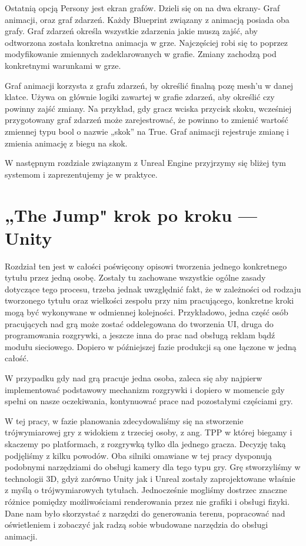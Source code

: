 \documentclass[openright]{xmgr}
\begin{document}
Ostatnią opcją Persony jest ekran grafów. Dzieli się on na dwa ekrany- Graf animacji, oraz graf zdarzeń. Każdy Blueprint związany z animacją posiada oba grafy.
Graf zdarzeń określa wszystkie zdarzenia jakie muszą zajść, aby odtworzona została konkretna animacja w grze. Najczęściej robi się to poprzez modyfikowanie zmiennych zadeklarowanych w grafie. Zmiany zachodzą pod konkretnymi warunkami w grze.

Graf animacji korzysta z grafu zdarzeń, by określić finalną pozę mesh’u w danej klatce. Używa on głównie logiki zawartej w grafie zdarzeń, aby określić czy powinny zajść zmiany. Na przykład, gdy gracz wciska przycisk skoku, wcześniej przygotowany graf zdarzeń może zarejestrować, że powinno to zmienić wartość zmiennej typu bool o nazwie „skok” na True.  Graf animacji rejestruje zmianę i zmienia animację z biegu na skok.

W następnym rozdziale związanym  z Unreal Engine przyjrzymy się bliżej tym systemom i zaprezentujemy je w praktyce.

\chapter{„The Jump" krok po kroku — Unity}

Rozdział ten jest w całości poświęcony opisowi tworzenia jednego konkretnego tytułu przez jedną osobę. Zostały tu zachowane wszystkie ogólne zasady dotyczące tego procesu, trzeba jednak uwzględnić fakt, że w zależności od rodzaju tworzonego tytułu oraz wielkości zespołu przy nim pracującego, konkretne kroki mogą być wykonywane w odmiennej kolejności. Przykładowo, jedna część osób pracujących nad grą może zostać oddelegowana do tworzenia UI, druga do programowania rozgrywki, a jeszcze inna do prac nad obsługą reklam bądź modułu sieciowego. Dopiero w późniejszej fazie produkcji są one łączone w jedną całość.

W przypadku gdy nad grą pracuje jedna osoba, zaleca się aby najpierw implementować podstawowy mechanizm rozgrywki i dopiero w momencie gdy spełni on nasze oczekiwania, kontynuować prace nad pozostałymi częściami gry.

W tej pracy, w fazie planowania zdecydowaliśmy się na stworzenie trójwymiarowej gry z widokiem z trzeciej osoby, z ang. TPP w której biegamy i skaczemy po platformach, z rozgrywką tylko dla jednego gracza. Decyzję taką podjęliśmy z kilku powodów. Oba silniki omawiane w tej pracy dysponują podobnymi narzędziami do obsługi kamery dla tego typu gry. Grę stworzyliśmy w technologii 3D, gdyż zarówno Unity jak i Unreal zostały zaprojektowane właśnie z myślą o trójwymiarowych tytułach. Jednocześnie mogliśmy dostrzec znaczne różnice pomiędzy możliwościami renderowania przez nie grafiki i obsługi fizyki. Dane nam było skorzystać z narzędzi do generowania terenu, popracować nad oświetleniem i zobaczyć jak radzą sobie wbudowane narzędzia do obsługi animacji.
\end{document}
